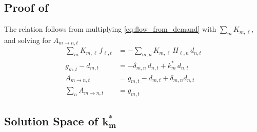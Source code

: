 \documentclass[11pt,twocolumn]{article}
\newcommand{\nodalgeneration}[1][n]{g_{#1,t}}
\newcommand{\nodaldemand}[1][n]{d_{#1,t}}
\newcommand{\incidence}[1][n]{K_{#1,\ell}}
\newcommand{\ptdf}[1][n]{H_{\ell,#1}}
\newcommand{\slackk}[1][n]{k^*_{#1}}
\newcommand{\flow}{f_{\ell,t}}
\newcommand{\allocatePeer}[1][m \rightarrow n]{A_{#1,t}}
\begin{document}
\subsection{\texorpdfstring{Proof of }{Second proof}}
\label{sec:proof_sum_n_allocate_peer}
The relation follows from multiplying \cref{eq:flow_from_demand} with $\sum_m \incidence[m]$, and solving for $\allocatePeer$
\begin{align}
\sum_m \incidence[m] \, \flow &= - \sum_{m,n} \incidence[m] \, \ptdf \, \nodaldemand \\
\nodalgeneration[m] - \nodaldemand[m] &= - \delta_{m,n} \, \nodaldemand + \slackk[m] \, \nodaldemand    \\
\allocatePeer &= \nodalgeneration[m] - \nodaldemand[m] + \delta_{m,n} \nodaldemand \\
\sum_n \allocatePeer &= \nodalgeneration[m]
\end{align}



\subsection{\texorpdfstring{Solution Space of $\boldsymbol{\slackk[m]}$}{Solution Space of the Slack}}
\label{sec:solution_space_of_the_slack}
\end{document}
